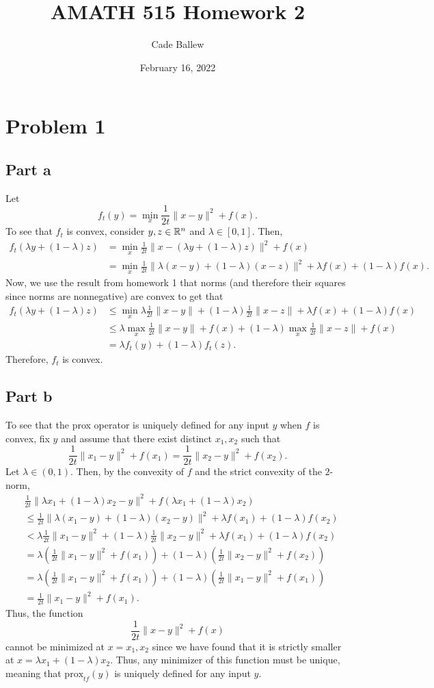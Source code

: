 \documentclass{article}
\title{AMATH 515 Homework 2}
\author{Cade Ballew}
\date{February 16, 2022}
\newcommand{\prox}{\mathrm{prox}}
\begin{document}
\maketitle
\section{Problem 1}
\subsection{Part a}
Let 
\[
f_t(y) = \min_x \frac{1}{2t}\|x-y\|^2 + f(x).
\]
To see that $f_t$ is convex, consider $y,z\in\mathbb{R}^n$ and $\lambda\in[0,1]$. Then,
\begin{align*}
f_t(\lambda y+(1-\lambda)z)&=\min_x \frac{1}{2t}\|x-(\lambda y+(1-\lambda)z)\|^2 + f(x)\\&=\min_x \frac{1}{2t}\|\lambda(x-y)+(1-\lambda)(x-z)\|^2 + \lambda f(x)+(1-\lambda)f(x).
\end{align*}
Now, we use the result from homework 1 that norms (and therefore their squares since norms are nonnegative) are convex to get that
\begin{align*}
f_t(\lambda y+(1-\lambda)z)&\leq\min_x\lambda\frac{1}{2t}\|x-y\|+(1-\lambda)\frac{1}{2t}\|x-z\|+ \lambda f(x)+(1-\lambda)f(x)\\&\leq
\lambda\max_x\frac{1}{2t}\|x-y\|+f(x)+(1-\lambda)\max_x\frac{1}{2t}\|x-z\|+f(x)\\&=\lambda f_t(y)+(1-\lambda)f_t(z).
\end{align*}
Therefore, $f_t$ is convex.

\subsection{Part b}
To see that the prox operator is uniquely defined for any input $y$ when $f$ is convex, fix $y$ and assume that there exist distinct $x_1,x_2$ such that 
\[
\frac{1}{2t}\|x_1-y\|^2+f(x_1)=\frac{1}{2t}\|x_2-y\|^2+f(x_2).
\]
Let $\lambda\in(0,1)$. Then, by the convexity of $f$ and the strict convexity of the $2$-norm,
\begin{align*}
&\frac{1}{2t}\|\lambda x_1+(1-\lambda)x_2-y\|^2+f(\lambda x_1+(1-\lambda)x_2)\\&\leq
\frac{1}{2t}\|\lambda (x_1-y)+(1-\lambda)(x_2-y)\|^2+\lambda f(x_1)+(1-\lambda)f(x_2)\\&<
\lambda\frac{1}{2t}\|x_1-y\|^2+(1-\lambda)\frac{1}{2t}\|x_2-y\|^2+\lambda f(x_1)+(1-\lambda)f(x_2)\\&=
\lambda\left(\frac{1}{2t}\|x_1-y\|^2+f(x_1)\right)+(1-\lambda)\left(\frac{1}{2t}\|x_2-y\|^2+f(x_2)\right)\\&=
\lambda\left(\frac{1}{2t}\|x_1-y\|^2+f(x_1)\right)+(1-\lambda)\left(\frac{1}{2t}\|x_1-y\|^2+f(x_1)\right)\\&=
\frac{1}{2t}\|x_1-y\|^2+f(x_1).
\end{align*}
Thus, the function
\[
\frac{1}{2t}\|x-y\|^2+f(x)
\]
cannot be minimized at $x=x_1,x_2$ since we have found that it is strictly smaller at $x=\lambda x_1+(1-\lambda)x_2$. Thus, any minimizer of this function must be unique, meaning that $\prox_{t f}(y)$ is uniquely defined for any input $y$.
\end{document}
